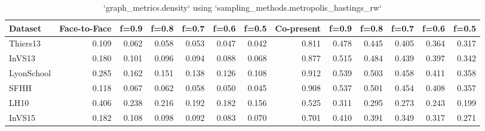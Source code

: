 \begin{table}[ht]
\begin{tabular}{lrrrrrrrrrrrr}
\hline
 Dataset    &   Face-to-Face &   f=0.9 &   f=0.8 &   f=0.7 &   f=0.6 &   f=0.5 &   Co-present &   f=0.9 &   f=0.8 &   f=0.7 &   f=0.6 &   f=0.5 \\
\hline
 Thiers13   &          0.109 &   0.062 &   0.058 &   0.053 &   0.047 &   0.042 &        0.811 &   0.478 &   0.445 &   0.405 &   0.364 &   0.317 \\
 InVS13     &          0.180 &   0.101 &   0.096 &   0.094 &   0.088 &   0.068 &        0.877 &   0.515 &   0.484 &   0.439 &   0.397 &   0.342 \\
 LyonSchool &          0.285 &   0.162 &   0.151 &   0.138 &   0.126 &   0.108 &        0.912 &   0.539 &   0.503 &   0.458 &   0.411 &   0.358 \\
 SFHH       &          0.118 &   0.067 &   0.062 &   0.058 &   0.050 &   0.045 &        0.908 &   0.537 &   0.501 &   0.454 &   0.408 &   0.357 \\
 LH10       &          0.406 &   0.238 &   0.216 &   0.192 &   0.182 &   0.156 &        0.525 &   0.311 &   0.295 &   0.273 &   0.243 &   0.199 \\
 InVS15     &          0.182 &   0.108 &   0.098 &   0.092 &   0.083 &   0.070 &        0.701 &   0.410 &   0.391 &   0.349 &   0.317 &   0.271 \\
\hline
\end{tabular}
\caption{`graph_metrics.density` using `sampling_methods.metropolis_hastings_rw`}
\end{table}
